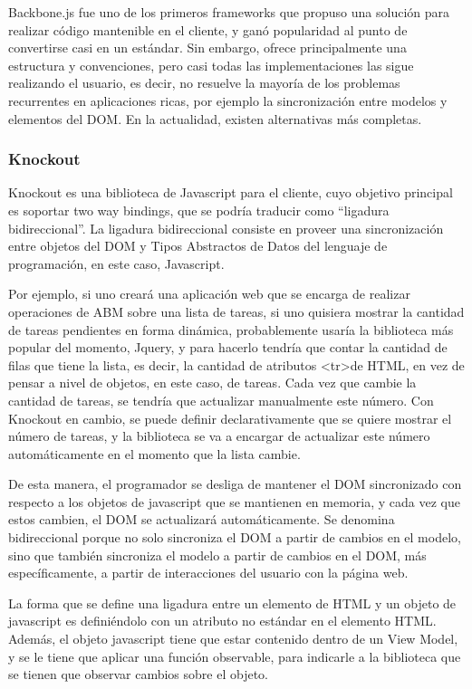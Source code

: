 \documentclass[doc,helv,longtable]{article}
\begin{document}
Backbone.js fue uno de los primeros frameworks que propuso una solución para realizar código mantenible en el cliente, y ganó popularidad al punto de convertirse casi en un estándar. Sin embargo, ofrece principalmente una estructura y convenciones, pero casi todas las implementaciones las sigue realizando el usuario, es decir, no resuelve la mayoría de los problemas recurrentes en aplicaciones ricas, por ejemplo la sincronización entre modelos y elementos del DOM. En la actualidad, existen alternativas más completas\cite{derbyrant1}.

\subsubsection{Knockout}
Knockout\cite{knockout} es una biblioteca de Javascript para el cliente, cuyo objetivo principal es soportar two way bindings, que se podría traducir como “ligadura bidireccional”. La ligadura bidireccional consiste en proveer una sincronización entre objetos del DOM y Tipos Abstractos de Datos del lenguaje de programación, en este caso, Javascript. 

Por ejemplo, si uno creará una aplicación web que se encarga de realizar operaciones de ABM sobre una lista de tareas, si uno quisiera mostrar la cantidad de tareas pendientes en forma dinámica, probablemente usaría la biblioteca más popular del momento, Jquery, y para hacerlo tendría que contar la cantidad de filas que tiene la lista, es decir, la cantidad de atributos \textless tr\textgreater  de HTML, en vez de pensar a nivel de objetos, en este caso, de tareas. Cada vez que cambie la cantidad de tareas, se tendría que actualizar manualmente este número. Con Knockout en cambio, se puede definir declarativamente que se quiere mostrar el número de tareas, y la biblioteca se va a encargar de actualizar este número automáticamente en el momento que la lista cambie. 

De esta manera, el programador se desliga de mantener el DOM sincronizado con respecto a los objetos de javascript que se mantienen en memoria, y cada vez que estos cambien, el DOM se actualizará automáticamente. Se denomina bidireccional porque no solo sincroniza el DOM a partir de cambios en el modelo, sino que también sincroniza el modelo a partir de cambios en el DOM, más específicamente, a partir de interacciones del usuario con la página web. 

La forma que se define una ligadura entre un elemento de HTML y un objeto de javascript es definiéndolo con un atributo no estándar en el elemento HTML. Además, el objeto javascript tiene que estar contenido dentro de un View Model, y se le tiene que aplicar una función observable, para indicarle a la biblioteca que se tienen que observar cambios sobre el objeto.
\end{document}
